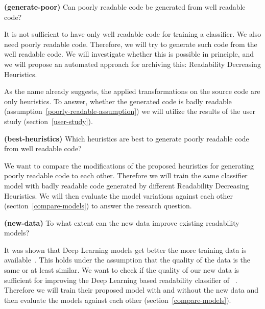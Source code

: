 \documentclass[%
class=scrreprt,
chapterprefix=false,%
open=right,%
twoside=false,%
paper=a4,%
logofile={Logo\_zentral\_farbig\_EN.png},%
thesistype=master,%
UKenglish,%
]{se2thesis}
\begin{document}
	\begin{resq} \textbf{(generate-poor)} Can poorly readable code be generated from well readable code?\end{resq} \label{generate-poor}
	It is not sufficient to have only well readable code for training a classifier. We also need poorly readable code. Therefore, we will try to generate such code from the well readable code. We will investigate whether this is possible in principle, and we will propose an automated approach for archiving this: Readability Decreasing Heuristics.
	
	As the name already suggests, the applied transformations on the source code are only heuristics. To answer, whether the generated code is badly readable (assumption~\ref{poorly-readable-assumption}) we will utilize the results of the user study (section~\ref{user-study}).
	
	\begin{resq} \textbf{(best-heuristics)} Which heuristics are best to generate poorly readable code from well readable code?\end{resq} \label{best-heuristic}
	We want to compare the modifications of the proposed heuristics for generating poorly readable code to each other. Therefore we will train the same classifier model with badly readable code generated by different Readability Decreasing Heuristics. We will then evaluate the model variations against each other (section~\ref{compare-models}) to answer the research question.
	
	\begin{resq} \textbf{(new-data)} To what extent can the new data improve existing readability models?\end{resq} \label{new-data}
	It was shown that Deep Learning models get better the more training data is available~\cite{hestness2017deep}. This holds under the assumption that the quality of the data is the same or at least similar. We want to check if the quality of our new data is sufficient for improving the Deep Learning based readability classifier of \citeauthor{mi2022towards}~\cite{mi2022towards}. Therefore we will train their proposed model with and without the new data and then evaluate the models against each other (section~\ref{compare-models}).
	
	\pagebreak
	
	
\end{document}
